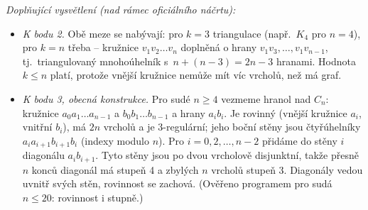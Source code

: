 \medskip
\noindent\textit{Doplňující vysvětlení (nad rámec oficiálního náčrtu):}
\begin{itemize}
  \item \emph{K bodu 2.} Obě meze se nabývají: pro $k=3$ triangulace (např.\ $K_4$ pro $n=4$), pro $k=n$ třeba  -- kružnice $v_1v_2\dots v_n$ doplněná o hrany $v_1v_3,\dots,v_1v_{n-1}$, tj.\ triangulovaný mnohoúhelník s~$n+(n-3)=2n-3$ hranami. Hodnota $k\leq n$ platí, protože vnější kružnice nemůže mít víc vrcholů, než má graf.
  \item \emph{K bodu 3, obecná konstrukce.} Pro sudé $n\geq 4$ vezmeme hranol nad $C_n$: kružnice $a_0a_1\dots a_{n-1}$ a $b_0b_1\dots b_{n-1}$ a hrany $a_ib_i$. Je rovinný (vnější kružnice $a_i$, vnitřní $b_i$), má $2n$ vrcholů a je 3-regulární; jeho boční stěny jsou čtyřúhelníky $a_ia_{i+1}b_{i+1}b_i$ (indexy modulo $n$). Pro $i=0,2,\dots,n-2$ přidáme do stěny $i$ diagonálu $a_ib_{i+1}$. Tyto stěny jsou po dvou vrcholově disjunktní, takže přesně $n$ konců diagonál má stupeň 4 a zbylých $n$ vrcholů stupeň 3. Diagonály vedou uvnitř svých stěn, rovinnost se zachová. (Ověřeno programem pro sudá $n\leq 20$: rovinnost i stupně.)
\end{itemize}
